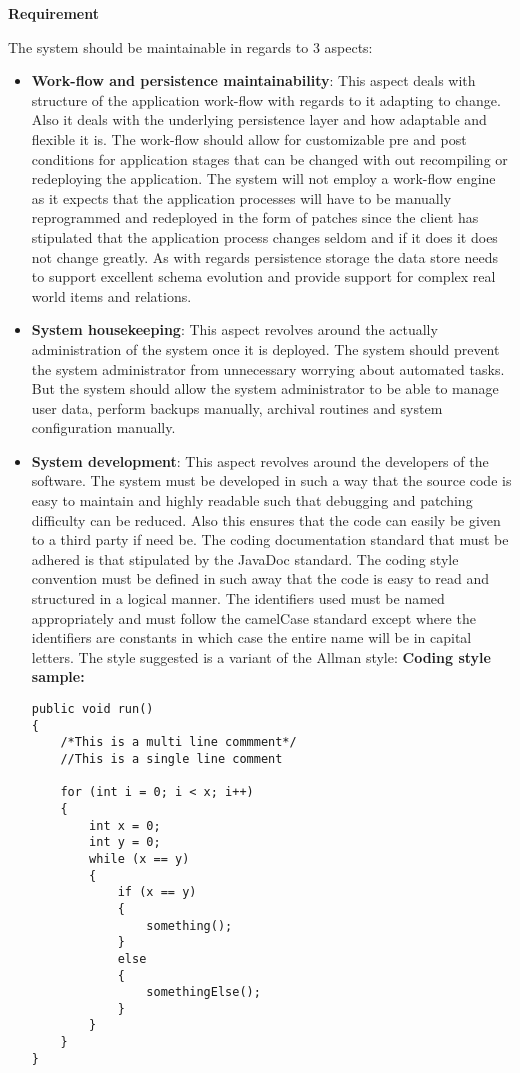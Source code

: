 \begin{flushleft}
\vspace{0.1in}

\textbf{Requirement}

The system should be maintainable in regards to 3 aspects: 
\begin{itemize}
\item \textbf{Work-flow and persistence maintainability}: This aspect deals with structure of the application work-flow with regards to it adapting to change. Also it deals with the underlying persistence layer and how adaptable and flexible it is. The work-flow should allow for customizable pre and post conditions for application stages that can be changed with out recompiling or redeploying the application. The system will not employ a work-flow engine as it expects that the application processes will have to be manually reprogrammed and redeployed in the form of patches since the client has stipulated that the application process changes seldom and if it does it does not change greatly. As with regards persistence storage the data store needs to support excellent schema evolution and provide support for complex real world items and relations.
\item \textbf{System housekeeping}: This aspect revolves around the actually administration of the system once it is deployed. The system should prevent the system administrator from unnecessary worrying about automated tasks. But the system should allow the system administrator to be able to manage user data, perform backups manually, archival routines and system configuration manually. 
\item \textbf{System development}: This aspect revolves around the developers of the software. The system must be developed in such a way that the source code is easy to maintain and highly readable such that debugging and patching difficulty can be reduced. Also this ensures that the code can easily be given to a third party if need be. The coding documentation standard that must be adhered is that stipulated by the JavaDoc standard. The coding style convention must be defined in such away that the code is easy to read and structured in a logical manner. The identifiers used must be named appropriately and must follow the camelCase standard except where the identifiers are constants in which case the entire name will be in capital letters. The style suggested is a variant of the Allman style:
\newpage
\textbf{Coding style sample:}\\
\begin{lstlisting}
public void run()
{
	/*This is a multi line commment*/
	//This is a single line comment
	
	for (int i = 0; i < x; i++)
	{
		int x = 0;
		int y = 0;
		while (x == y)
		{
			if (x == y)
			{
			    something();			    
			}
			else
			{
				somethingElse();
			}
		}
	}
}
\end{lstlisting}

\end{itemize}


\end{flushleft}

\vspace{0.1in}